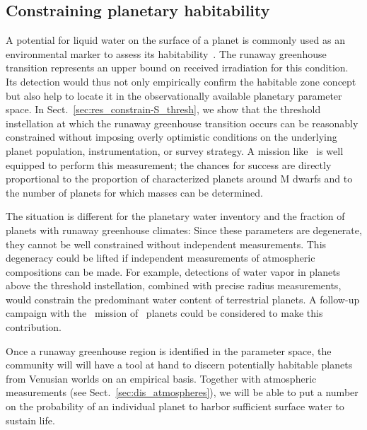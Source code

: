\documentclass[twocolumn,twocolappendix]{aastex631}
\begin{document}
\subsection{Constraining planetary habitability}\label{sec:habitability}
A potential for liquid water on the surface of a planet is commonly used as an environmental marker to assess its habitability~\citep{Huang1959,Hart1978,Kasting1993,Kaltenegger2011,Kopparapu2013}.
The runaway greenhouse transition represents an upper bound on received irradiation for this condition.
Its detection would thus not only empirically confirm the habitable zone concept but also help to locate it in the observationally available planetary parameter space.
In Sect.~\ref{sec:res_constrain-S_thresh}, we show that the threshold instellation at which the runaway greenhouse transition occurs can be reasonably constrained without imposing overly optimistic conditions on the underlying planet population, instrumentation, or survey strategy.
A mission like \plato\ is well equipped to perform this measurement; the chances for success are directly proportional to the proportion of characterized planets around M dwarfs and to the number of planets for which masses can be determined.

The situation is different for the planetary water inventory and the fraction of planets with runaway greenhouse climates:
Since these parameters are degenerate, they cannot be well constrained without independent measurements.
This degeneracy could be lifted if independent measurements of atmospheric compositions can be made.
For example, detections of water vapor in planets above the threshold instellation, combined with precise radius measurements, would constrain the predominant water content of terrestrial planets.
A follow-up campaign with the \ariel\ mission of \plato\ planets could be considered to make this contribution.

Once a runaway greenhouse region is identified in the parameter space, the community will will have a tool at hand to discern potentially habitable planets from Venusian worlds on an empirical basis.
Together with atmospheric measurements (see Sect.~\ref{sec:dis_atmospheres}), we will be able to put a number on the probability of an individual planet to harbor sufficient surface water to sustain life.
\end{document}
